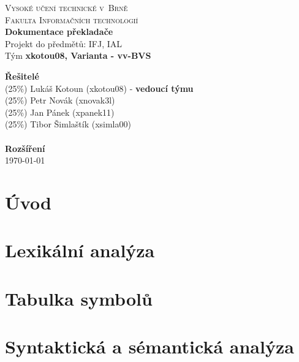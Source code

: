 \documentclass[a4paper]{article}
\begin{document}
\begin{titlepage}
    \begin{center}
        \textsc{
        {\Huge Vysoké učení technické v~Brně}\\[0.5em]
        {\huge Fakulta Informačních technologií}} \\
        {\Huge \textbf{Dokumentace překladače}} \\[0.4em]
        {\Large Projekt do předmětů: IFJ, IAL} \\[2em]
        {\Large Tým \textbf{xkotou08, Varianta - vv-BVS}}
    \end{center}
    {\Large \textbf{Řešitelé}} \\[0.4em]
        {\Large
        \hspace*{0.5cm} (25\%) Lukáš Kotoun (xkotou08) - \textbf{vedoucí týmu}\\
        \hspace*{0.5cm} (25\%) Petr Novák (xnovak3l) \\
        \hspace*{0.5cm} (25\%) Jan Pánek (xpanek11) \\
        \hspace*{0.5cm} (25\%) Tibor Šimlaštík (xsimla00) \\
        }
     \\
    {\Large \textbf{Rozšíření}} \\[0.4em]


    {\Large \today}
\end{titlepage}


\tableofcontents
\newpage


\section{Úvod}
\section{Lexikální analýza}
\section{Tabulka symbolů}
\section{Syntaktická a sémantická analýza}
\end{document}
